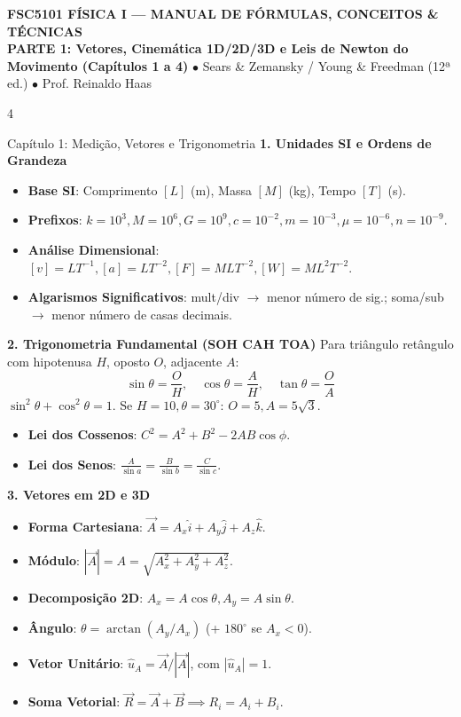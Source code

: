 \documentclass[9pt,a4paper,landscape]{extarticle}
\newcommand{\cabecalho}[1]{%
\begin{tcolorbox}[colback=primaryblue,colframe=accentcyan,arc=3pt,top=1.5pt,bottom=1.5pt,coltext=white,halign=center,breakable=false]
    {\bfseries\sffamily\normalsize FSC5101 FÍSICA I --- MANUAL DE FÓRMULAS, CONCEITOS \& TÉCNICAS}\\[0.5pt]
    {\scriptsize \textbf{#1} \quad $\bullet$ \quad Sears \& Zemansky / Young \& Freedman (12ª ed.) \quad $\bullet$ \quad Prof. Reinaldo Haas}
\end{tcolorbox}\vspace{-2pt}}
\begin{document}
\cabecalho{PARTE 1: Vetores, Cinemática 1D/2D/3D e Leis de Newton do Movimento (Capítulos 1 a 4)}
\begin{multicols*}{4}

\begin{topicbox}{Capítulo 1: Medição, Vetores e Trigonometria}
\textbf{1. Unidades SI e Ordens de Grandeza}
\begin{itemize}
    \item \textbf{Base SI}: Comprimento $[L]$ (m), Massa $[M]$ (kg), Tempo $[T]$ (s).
    \item \textbf{Prefixos}: $k=10^3, M=10^6, G=10^9, c=10^{-2}, m=10^{-3}, \mu=10^{-6}, n=10^{-9}$.
    \item \textbf{Análise Dimensional}: $[v]=LT^{-1}, [a]=LT^{-2}, [F]=MLT^{-2}, [W]=ML^2T^{-2}$.
    \item \textbf{Algarismos Significativos}: mult/div $\to$ menor número de sig.; soma/sub $\to$ menor número de casas decimais.
\end{itemize}

\textbf{2. Trigonometria Fundamental (SOH CAH TOA)}
Para triângulo retângulo com hipotenusa $H$, oposto $O$, adjacente $A$:
\begin{equation*}
    \sin\theta = \frac{O}{H}, \quad \cos\theta = \frac{A}{H}, \quad \tan\theta = \frac{O}{A}
\end{equation*}
$\sin^2\theta + \cos^2\theta = 1$. Se $H=10, \theta=30^\circ$: $O=5, A=5\sqrt{3}$.
\begin{itemize}
    \item \textbf{Lei dos Cossenos}: $C^2 = A^2 + B^2 - 2AB\cos\phi$.
    \item \textbf{Lei dos Senos}: $\frac{A}{\sin a} = \frac{B}{\sin b} = \frac{C}{\sin c}$.
\end{itemize}

\textbf{3. Vetores em 2D e 3D}
\begin{itemize}
    \item \textbf{Forma Cartesiana}: $\vec{A} = A_x \hat{i} + A_y \hat{j} + A_z \hat{k}$.
    \item \textbf{Módulo}: $|\vec{A}| = A = \sqrt{A_x^2 + A_y^2 + A_z^2}$.
    \item \textbf{Decomposição 2D}: $A_x = A\cos\theta, A_y = A\sin\theta$.
    \item \textbf{Ângulo}: $\theta = \arctan(A_y / A_x)$ (+ $180^\circ$ se $A_x < 0$).
    \item \textbf{Vetor Unitário}: $\hat{u}_A = \vec{A}/|\vec{A}|$, com $|\hat{u}_A| = 1$.
    \item \textbf{Soma Vetorial}: $\vec{R} = \vec{A}+\vec{B} \implies R_i = A_i + B_i$.
\end{itemize}


\end{topicbox}
\end{multicols*}
\end{document}
